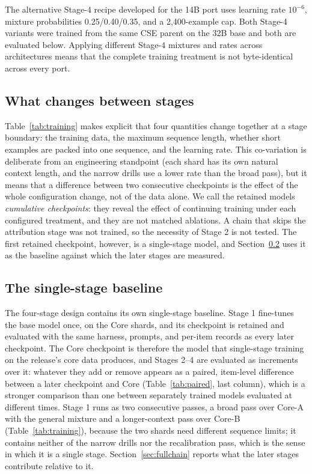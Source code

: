 \documentclass[a4paper,fleqn]{cas-dc}
\begin{document}
The alternative Stage-4 recipe developed for the 14B port uses learning rate $10^{-6}$, mixture probabilities 0.25/0.40/0.35, and a 2,400-example cap. Both Stage-4 variants were trained from the same CSE parent on the 32B base and both are evaluated below. Applying different Stage-4 mixtures and rates across architectures means that the complete training treatment is not byte-identical across every port.

\subsection{What changes between stages}\label{sec:stagechanges}
Table~\ref{tab:training} makes explicit that four quantities change together at a stage boundary: the training data, the maximum sequence length, whether short examples are packed into one sequence, and the learning rate. This co-variation is deliberate from an engineering standpoint (each shard has its own natural context length, and the narrow drills use a lower rate than the broad pass), but it means that a difference between two consecutive checkpoints is the effect of the whole configuration change, not of the data alone. We call the retained models \emph{cumulative checkpoints}: they reveal the effect of continuing training under each configured treatment, and they are not matched ablations. A chain that skips the attribution stage was not trained, so the necessity of Stage 2 is not tested. The first retained checkpoint, however, is a single-stage model, and Section~\ref{sec:singlestage} uses it as the baseline against which the later stages are measured.

\subsection{The single-stage baseline}\label{sec:singlestage}
The four-stage design contains its own single-stage baseline. Stage 1 fine-tunes the base model once, on the Core shards, and its checkpoint is retained and evaluated with the same harness, prompts, and per-item records as every later checkpoint. The Core checkpoint is therefore the model that single-stage training on the release's core data produces, and Stages 2--4 are evaluated as increments over it: whatever they add or remove appears as a paired, item-level difference between a later checkpoint and Core (Table~\ref{tab:paired}, last column), which is a stronger comparison than one between separately trained models evaluated at different times. Stage 1 runs as two consecutive passes, a broad pass over Core-A with the general mixture and a longer-context pass over Core-B (Table~\ref{tab:training}), because the two shards need different sequence limits; it contains neither of the narrow drills nor the recalibration pass, which is the sense in which it is a single stage. Section~\ref{sec:fullchain} reports what the later stages contribute relative to it.
\end{document}
